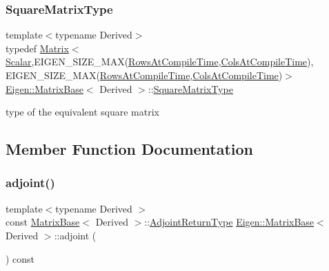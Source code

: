 \subsubsection{\texorpdfstring{SquareMatrixType}{SquareMatrixType}}
{\footnotesize\ttfamily template$<$typename Derived$>$ \\
typedef \mbox{\hyperlink{class_eigen_1_1_matrix}{Matrix}}$<$\mbox{\hyperlink{class_eigen_1_1_dense_base_a5feed465b3a8e60c47e73ecce83e39a2}{Scalar}},E\+I\+G\+E\+N\+\_\+\+S\+I\+Z\+E\+\_\+\+M\+AX(\mbox{\hyperlink{class_eigen_1_1_dense_base_a86241c772c74c04eeeb0480b99c5ab77adb37c78ebbf15aa20b65c3b70415a1ab}{Rows\+At\+Compile\+Time}},\mbox{\hyperlink{class_eigen_1_1_dense_base_a86241c772c74c04eeeb0480b99c5ab77a787f85fd67ee5985917eb2cef6e70441}{Cols\+At\+Compile\+Time}}), E\+I\+G\+E\+N\+\_\+\+S\+I\+Z\+E\+\_\+\+M\+AX(\mbox{\hyperlink{class_eigen_1_1_dense_base_a86241c772c74c04eeeb0480b99c5ab77adb37c78ebbf15aa20b65c3b70415a1ab}{Rows\+At\+Compile\+Time}},\mbox{\hyperlink{class_eigen_1_1_dense_base_a86241c772c74c04eeeb0480b99c5ab77a787f85fd67ee5985917eb2cef6e70441}{Cols\+At\+Compile\+Time}})$>$ \mbox{\hyperlink{class_eigen_1_1_matrix_base}{Eigen\+::\+Matrix\+Base}}$<$ Derived $>$\+::\mbox{\hyperlink{class_eigen_1_1_matrix_base_a3cf75a9110a1a28c493e124c8a7fcade}{Square\+Matrix\+Type}}}

type of the equivalent square matrix 

\subsection{Member Function Documentation}
\mbox{\label{class_eigen_1_1_matrix_base_afacca1f88da57e5cd87dd07c8ff926bb}} 
\subsubsection{\texorpdfstring{adjoint()}{adjoint()}}
{\footnotesize\ttfamily template$<$typename Derived $>$ \\
const \mbox{\hyperlink{class_eigen_1_1_matrix_base}{Matrix\+Base}}$<$ Derived $>$\+::\mbox{\hyperlink{struct_eigen_1_1internal_1_1true__type}{Adjoint\+Return\+Type}} \mbox{\hyperlink{class_eigen_1_1_matrix_base}{Eigen\+::\+Matrix\+Base}}$<$ Derived $>$\+::adjoint (\begin{DoxyParamCaption}{ }\end{DoxyParamCaption}) const\hspace{0.3cm}{\ttfamily [inline]}}


